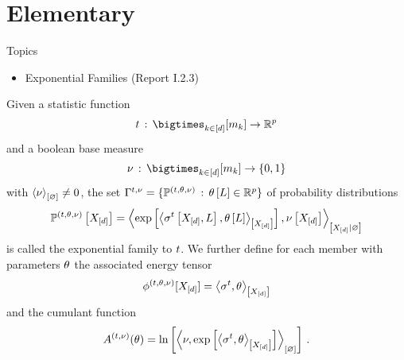 \chapter{Elementary \ComputationActivationNetworks{}}


Topics
\begin{itemize}
    \item Exponential Families (Report I.2.3)
\end{itemize}



\label{sec:exponentialFamilies}





\begin{definition}
    \label{def:expFamily}
    Given a statistic function
    \begin{align*}
        \sstat \defcols \facstates \rightarrow \parspace
    \end{align*}
    and a boolean base measure
    \begin{align*}
        \basemeasure \defcols \facstates \rightarrow \ozset
    \end{align*}
    with $\left\langle \nu\right\rangle_{\left[ \varnothing \right]}\neq0$, the set $\Gamma^{t,\nu}=\{\mathbb{P}^{(t,\theta,\nu)}\,:\,\theta\left[L\right]\in\mathbb{R}^{p}\}$ of probability distributions
    \begin{align*}
        \mathbb{P}^{(t,\theta,\nu)}\left[X_{[d]}\right]
        = \left\langle \mathrm{exp}\left[\left\langle \sigma^{t}\left[X_{[d]},L\right],\theta\left[L\right]\right\rangle_{\left[ X_{[d]} \right]}\right],\nu\left[X_{[d]}\right]\right\rangle_{\left[ X_{[d]} | \varnothing \right]}
    \end{align*}
    is called the exponential family to $t$.
    We further define for each member with parameters $\theta$ the associated energy tensor
    \begin{align*}
        \phi^{(t,\theta,\nu)}[X_{[d]}] = \left\langle \sigma^{t},\theta\right\rangle_{\left[ X_{[d]} \right]}
    \end{align*}
    and the cumulant function
    \begin{align*}
         A^{(t,\nu)}(\theta) = \ln \left[ \left\langle \nu,\mathrm{exp}\left[\left\langle \sigma^{t},\theta\right\rangle_{\left[ X_{[d]} \right]}\right]\right\rangle_{\left[ \varnothing \right]} \right] \, .
    \end{align*}
\end{definition}

